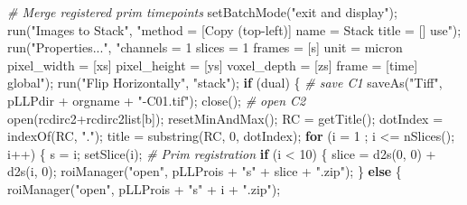\documentclass[10pt, b5paper, singlespacinge, twoside]{reedthesis} %
\newenvironment{Shaded}{}{}
\newcommand{\AttributeTok}[1]{#1}
\newcommand{\CommentTok}[1]{\textit{#1}}
\newcommand{\ControlFlowTok}[1]{\textbf{#1}}
\newcommand{\DecValTok}[1]{#1}
\newcommand{\FunctionTok}[1]{#1}
\newcommand{\NormalTok}[1]{#1}
\newcommand{\OtherTok}[1]{#1}
\newcommand{\SpecialCharTok}[1]{#1}
\newcommand{\StringTok}[1]{#1}
\theoremstyle{definition}
\theoremstyle{definition}
\theoremstyle{definition}
\theoremstyle{remark}
\begin{document}
\begin{Shaded}
\begin{Highlighting}[numbers=left,,]
    \CommentTok{\#   Merge registered prim timepoints}
        \FunctionTok{setBatchMode}\NormalTok{(}\StringTok{"exit and display"}\NormalTok{);}
        \FunctionTok{run}\NormalTok{(}\StringTok{"Images to Stack"}\NormalTok{, }\StringTok{"method = [Copy (top{-}left)] name = Stack title = [] use"}\NormalTok{);}
        \FunctionTok{run}\NormalTok{(}\StringTok{"Properties..."}\NormalTok{,}
            \StringTok{"channels = 1 slices = 1 frames = [s] unit = micron pixel\_width = [xs]}
\StringTok{            pixel\_height = [ys] voxel\_depth = [zs] frame = [time] global"}\NormalTok{); }
        \FunctionTok{run}\NormalTok{(}\StringTok{"Flip Horizontally"}\NormalTok{, }\StringTok{"stack"}\NormalTok{);}
        \ControlFlowTok{if}\NormalTok{ (dual) \{}
      \CommentTok{\# save C1}
          \FunctionTok{saveAs}\NormalTok{(}\StringTok{"Tiff"}\NormalTok{, pLLPdir }\SpecialCharTok{+}\NormalTok{ orgname }\SpecialCharTok{+} \StringTok{"{-}C01.tif"}\NormalTok{);}
          \FunctionTok{close}\NormalTok{();}
      \CommentTok{\# open C2}
          \FunctionTok{open}\NormalTok{(rcdirc2}\SpecialCharTok{+}\NormalTok{rcdirc2list[b]);}
            \FunctionTok{resetMinAndMax}\NormalTok{();}
\NormalTok{            RC }\OtherTok{=} \FunctionTok{getTitle}\NormalTok{();}
\NormalTok{            dotIndex }\OtherTok{=} \FunctionTok{indexOf}\NormalTok{(RC, }\StringTok{"."}\NormalTok{);}
\NormalTok{            title }\OtherTok{=} \FunctionTok{substring}\NormalTok{(RC, }\DecValTok{0}\NormalTok{, dotIndex);}
            \ControlFlowTok{for}\NormalTok{ (}\AttributeTok{i =} \DecValTok{1}\NormalTok{ ; i }\SpecialCharTok{\textless{}=} \FunctionTok{nSlices}\NormalTok{(); i}\SpecialCharTok{++}\NormalTok{) \{}
\NormalTok{                s }\OtherTok{=}\NormalTok{ i;}
                \FunctionTok{setSlice}\NormalTok{(i);}
            \CommentTok{\#   Prim registration}
                \ControlFlowTok{if}\NormalTok{ (i }\SpecialCharTok{\textless{}} \DecValTok{10}\NormalTok{) \{}
\NormalTok{                    slice }\OtherTok{=} \FunctionTok{d2s}\NormalTok{(}\DecValTok{0}\NormalTok{, }\DecValTok{0}\NormalTok{) }\SpecialCharTok{+} \FunctionTok{d2s}\NormalTok{(i, }\DecValTok{0}\NormalTok{);}
                    \FunctionTok{roiManager}\NormalTok{(}\StringTok{"open"}\NormalTok{, pLLProis }\SpecialCharTok{+} \StringTok{"s"} \SpecialCharTok{+}\NormalTok{ slice }\SpecialCharTok{+} \StringTok{".zip"}\NormalTok{);}
\NormalTok{                \} }\ControlFlowTok{else}\NormalTok{ \{}
                    \FunctionTok{roiManager}\NormalTok{(}\StringTok{"open"}\NormalTok{, pLLProis }\SpecialCharTok{+} \StringTok{"s"} \SpecialCharTok{+}\NormalTok{ i }\SpecialCharTok{+} \StringTok{".zip"}\NormalTok{);}

\end{Highlighting}
\end{Shaded}
\end{document}
